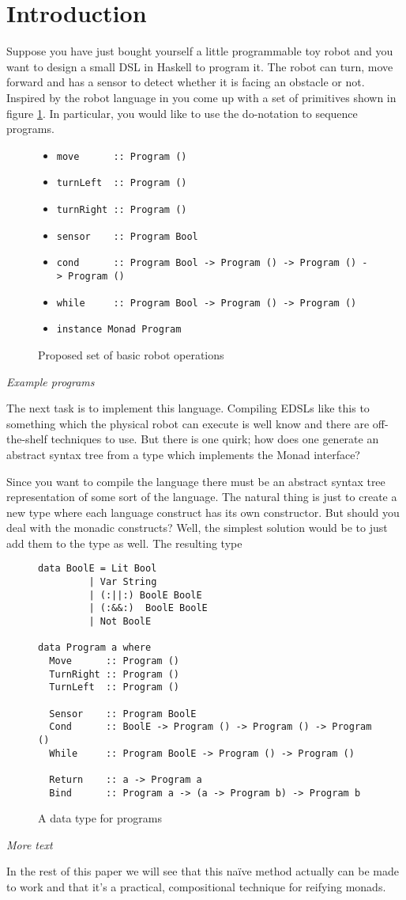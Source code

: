 \section{Introduction}

Suppose you have just bought yourself a little programmable toy robot
and you want to design a small DSL in Haskell to program it. The robot
can turn, move forward and has a sensor to detect whether it is facing
an obstacle or not. Inspired by the robot language in \cite{} you come
up with a set of primitives shown in figure
\ref{fig:interface}. In particular, you would like to use the
do-notation to sequence programs.

\begin{figure} 
\begin{itemize} 
  \item \verb!move      :: Program ()! 
  \item \verb!turnLeft  :: Program ()!
  \item \verb!turnRight :: Program ()!
  \item \verb!sensor    :: Program Bool!
  \item \verb!cond      :: Program Bool -> Program () -> Program () -> Program ()!
  \item \verb!while     :: Program Bool -> Program () -> Program ()!
  \item \verb!instance Monad Program!
\end{itemize} 
\label{fig:interface} 
\caption{Proposed set of basic robot operations} 
\end{figure}

\emph{Example programs}


The next task is to implement this language. Compiling EDSLs like this
to something which the physical robot can execute is well know and
there are off-the-shelf techniques to use. But there is one quirk; how
does one generate an abstract syntax tree from a type which implements
the Monad interface?

Since you want to compile the language there must be an abstract
syntax tree representation of some sort of the language. The natural
thing is just to create a new type where each language construct has
its own constructor. But should you deal with the monadic constructs?
Well, the simplest solution would be to just add them to the type as well. The resulting type 

\begin{figure}
\begin{verbatim}
data BoolE = Lit Bool
         | Var String
         | (:||:) BoolE BoolE
         | (:&&:)  BoolE BoolE
         | Not BoolE  

data Program a where
  Move      :: Program ()
  TurnRight :: Program ()
  TurnLeft  :: Program ()

  Sensor    :: Program BoolE
  Cond      :: BoolE -> Program () -> Program () -> Program ()
  While     :: Program BoolE -> Program () -> Program ()
   
  Return    :: a -> Program a 
  Bind      :: Program a -> (a -> Program b) -> Program b
\end{verbatim}
\label{fig:program}
\caption{A data type for programs}
\end{figure}

\emph{More text}

In the rest of this paper we will see that this na\"ive method
actually can be made to work and that it's a practical, compositional
technique for reifying monads.
